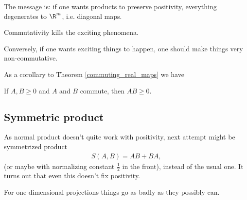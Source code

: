 The message is: if one wants products to preserve positivity, everything degenerates to $\R^{m}$, i.e. diagonal maps.

\begin{phil}
	Commutativity kills the exciting phenomena.
\end{phil}

Conversely, if one wants exciting things to happen, one should make things very non-commutative.

As a corollary to Theorem \ref{commuting_real_maps} we have

\begin{kor}
	If $A, B \geq 0$ and $A$ and $B$ commute, then $AB \geq 0$.
\end{kor}

\subsection{Symmetric product}

As normal product doesn't quite work with positivity, next attempt might be symmetrized product
\begin{align*}
	S(A, B) = AB + BA,
\end{align*}
(or maybe with normalizing constant $\frac{1}{2}$ in the front), instead of the usual one. It turns out that even this doesn't fix positivity.

For one-dimensional projections things go as badly as they possibly can.

